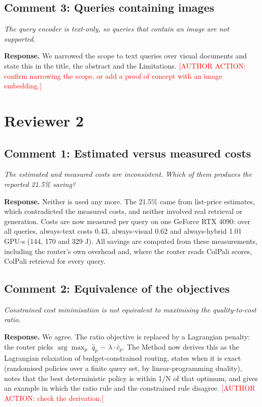 \documentclass[11pt]{article}
\newcommand{\reviewer}[1]{{\color{blue!55!black}\itshape #1\par}}
\begin{document}
\subsection*{Comment 3: Queries containing images}
\reviewer{The query encoder is text-only, so queries that contain an image are not supported.}
\textbf{Response.} We narrowed the scope to text queries over visual documents and state this in the title, the abstract and the Limitations. \textcolor{red}{[AUTHOR ACTION: confirm narrowing the scope, or add a proof of concept with an image embedding.]}

\section*{Reviewer 2}
\subsection*{Comment 1: Estimated versus measured costs}
\reviewer{The estimated and measured costs are inconsistent. Which of them produces the reported 21.5\% saving?}
\textbf{Response.} Neither is used any more. The 21.5\% came from list-price estimates, which contradicted the measured costs, and neither involved real retrieval or generation. Costs are now measured per query on one GeForce RTX 4090: over all queries, always-text costs 0.43, always-visual 0.62 and always-hybrid 1.01 GPU-s (144, 170 and 329 J). All savings are computed from these measurements, including the router's own overhead and, where the router reads ColPali scores, ColPali retrieval for every query.

\subsection*{Comment 2: Equivalence of the objectives}
\reviewer{Constrained cost minimisation is not equivalent to maximising the quality-to-cost ratio.}
\textbf{Response.} We agree. The ratio objective is replaced by a Lagrangian penalty: the router picks $\arg\max_p$ $\hat{q}_p$ $-$ $\lambda\cdot\bar{c}_p$. The Method now derives this as the Lagrangian relaxation of budget-constrained routing, states when it is exact (randomised policies over a finite query set, by linear-programming duality), notes that the best deterministic policy is within 1/N of that optimum, and gives an example in which the ratio rule and the constrained rule disagree. \textcolor{red}{[AUTHOR ACTION: check the derivation.]}
\end{document}
